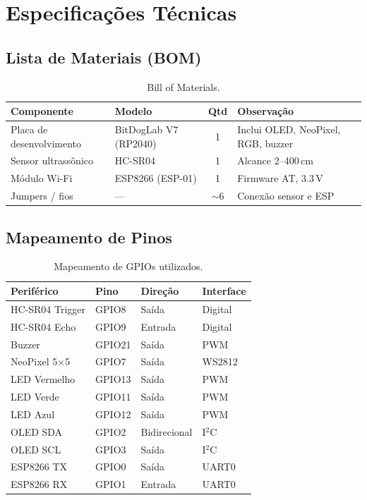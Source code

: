 \documentclass[12pt, a4paper]{article}
\begin{document}
\section{Especificações Técnicas}
\label{sec:especificacoes}

\subsection{Lista de Materiais (BOM)}

\begin{table}[H]
\centering
\caption{Bill of Materials.}
\begin{tabular}{llcl}
  \toprule
  \textbf{Componente} & \textbf{Modelo} & \textbf{Qtd} & \textbf{Observação} \\
  \midrule
  Placa de desenvolvimento & BitDogLab V7 (RP2040) & 1 & Inclui OLED, NeoPixel, RGB, buzzer \\
  Sensor ultrassônico & HC-SR04 & 1 & Alcance 2--400\,cm \\
  Módulo Wi-Fi & ESP8266 (ESP-01) & 1 & Firmware AT, 3.3\,V \\
  Jumpers / fios & --- & $\sim$6 & Conexão sensor e ESP \\
  \bottomrule
\end{tabular}
\end{table}

\subsection{Mapeamento de Pinos}

\begin{table}[H]
\centering
\caption{Mapeamento de GPIOs utilizados.}
\begin{tabular}{llll}
  \toprule
  \textbf{Periférico} & \textbf{Pino} & \textbf{Direção} & \textbf{Interface} \\
  \midrule
  HC-SR04 Trigger & GPIO8 & Saída & Digital \\
  HC-SR04 Echo    & GPIO9 & Entrada & Digital \\
  Buzzer          & GPIO21 & Saída & PWM \\
  NeoPixel 5$\times$5 & GPIO7 & Saída & WS2812 \\
  LED Vermelho    & GPIO13 & Saída & PWM \\
  LED Verde       & GPIO11 & Saída & PWM \\
  LED Azul        & GPIO12 & Saída & PWM \\
  OLED SDA        & GPIO2 & Bidirecional & I$^2$C \\
  OLED SCL        & GPIO3 & Saída & I$^2$C \\
  ESP8266 TX      & GPIO0 & Saída & UART0 \\
  ESP8266 RX      & GPIO1 & Entrada & UART0 \\
  \bottomrule
\end{tabular}
\end{table}
\end{document}
